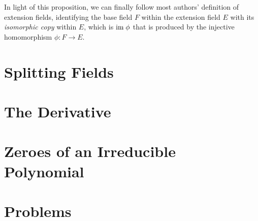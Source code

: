 In light of this proposition, we can finally follow most authors' definition of extension fields, identifying the base field $F$ within the extension field $E$ with its \textit{isomorphic copy} within $E$, which is $\mathrm{im}\; \phi$ that is produced by the injective homomorphism $\phi: F \to E$.


\section{Splitting Fields}

\section{The Derivative}

\section{Zeroes of an Irreducible Polynomial}

\newpage

\section{Problems}
